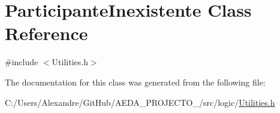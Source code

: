\hypertarget{class_participante_inexistente}{}\section{Participante\+Inexistente Class Reference}
\label{class_participante_inexistente}


{\ttfamily \#include $<$Utilities.\+h$>$}



The documentation for this class was generated from the following file\+:\begin{DoxyCompactItemize}
\item 
C\+:/\+Users/\+Alexandre/\+Git\+Hub/\+A\+E\+D\+A\+\_\+\+P\+R\+O\+J\+E\+C\+T\+O\+\_/src/logic/\hyperlink{_utilities_8h}{Utilities.\+h}\end{DoxyCompactItemize}
